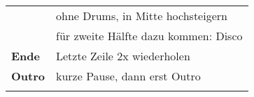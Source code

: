 \begin{tabular}{p{1.6cm}l}
	\chorus         & ohne Drums, in Mitte hochsteigern                              \\
	                & für zweite Hälfte dazu kommen: Disco                           \\
	\textbf{Ende}   & Letzte Zeile 2x wiederholen                                    \\
	\textbf{Outro}  & kurze Pause, dann erst Outro                                   \\
	                &                                                                \\
\end{tabular}

